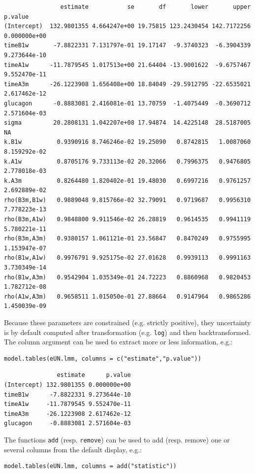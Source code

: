 \documentclass[12pt]{article}
\begin{document}
\begin{verbatim}
                estimate           se       df       lower       upper      p.value
(Intercept)  132.9801355 4.664247e+00 19.75815 123.2430454 142.7172256 0.000000e+00
timeB1w       -7.8822331 7.131797e-01 19.17147  -9.3740323  -6.3904339 9.273644e-10
timeA1w      -11.7879545 1.017513e+00 21.64404 -13.9001622  -9.6757467 9.552470e-11
timeA3m      -26.1223908 1.656408e+00 18.84049 -29.5912795 -22.6535021 2.617462e-12
glucagon      -0.8883081 2.416081e-01 13.70759  -1.4075449  -0.3690712 2.571604e-03
sigma         20.2808131 1.042207e+08 17.94874  14.4225148  28.5187005           NA
k.B1w          0.9390916 8.746246e-02 19.25090   0.8742815   1.0087060 8.159292e-02
k.A1w          0.8705176 9.733113e-02 20.32066   0.7996375   0.9476805 2.778018e-03
k.A3m          0.8264480 1.820402e-01 19.48030   0.6997216   0.9761257 2.692889e-02
rho(B3m,B1w)   0.9889048 9.815766e-02 32.79091   0.9719687   0.9956310 7.778223e-13
rho(B3m,A1w)   0.9848800 9.911546e-02 26.28819   0.9614535   0.9941119 5.780221e-11
rho(B3m,A3m)   0.9380157 1.061121e-01 23.56847   0.8470249   0.9755995 1.153947e-07
rho(B1w,A1w)   0.9976791 9.925175e-02 27.01628   0.9939113   0.9991163 3.730349e-14
rho(B1w,A3m)   0.9542904 1.035349e-01 24.72223   0.8860968   0.9820453 1.782712e-08
rho(A1w,A3m)   0.9658511 1.015050e-01 27.88664   0.9147964   0.9865286 1.450039e-09
\end{verbatim}

Because these parameters are constrained (e.g. strictly positive),
they uncertainty is by default computed after transformation
(e.g. \texttt{log}) and then backtransformed. The column argument can be used
to extract more or less information, e.g.:
\lstset{language=r,label= ,caption= ,captionpos=b,numbers=none}
\begin{lstlisting}
model.tables(eUN.lmm, columns = c("estimate","p.value"))
\end{lstlisting}

\begin{verbatim}
               estimate      p.value
(Intercept) 132.9801355 0.000000e+00
timeB1w      -7.8822331 9.273644e-10
timeA1w     -11.7879545 9.552470e-11
timeA3m     -26.1223908 2.617462e-12
glucagon     -0.8883081 2.571604e-03
\end{verbatim}


The functions \texttt{add} (resp. \texttt{remove}) can be used to add (resp. remove)
one or several columns from the default display, e.g.:
\lstset{language=r,label= ,caption= ,captionpos=b,numbers=none}
\begin{lstlisting}
model.tables(eUN.lmm, columns = add("statistic"))
\end{lstlisting}
\end{document}
